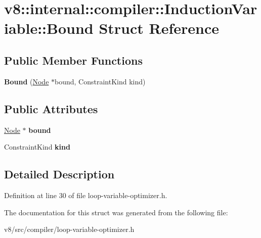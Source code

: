 \hypertarget{structv8_1_1internal_1_1compiler_1_1InductionVariable_1_1Bound}{}\section{v8\+:\+:internal\+:\+:compiler\+:\+:Induction\+Variable\+:\+:Bound Struct Reference}
\label{structv8_1_1internal_1_1compiler_1_1InductionVariable_1_1Bound}
\subsection*{Public Member Functions}
\begin{DoxyCompactItemize}
\item 
\mbox{\label{structv8_1_1internal_1_1compiler_1_1InductionVariable_1_1Bound_a3e6460bad855c54001a525810705dfc2}} 
{\bfseries Bound} (\mbox{\hyperlink{classv8_1_1internal_1_1compiler_1_1Node}{Node}} $\ast$bound, Constraint\+Kind kind)
\end{DoxyCompactItemize}
\subsection*{Public Attributes}
\begin{DoxyCompactItemize}
\item 
\mbox{\label{structv8_1_1internal_1_1compiler_1_1InductionVariable_1_1Bound_a56a3d55d4ac86681d7ff24e6509910f4}} 
\mbox{\hyperlink{classv8_1_1internal_1_1compiler_1_1Node}{Node}} $\ast$ {\bfseries bound}
\item 
\mbox{\label{structv8_1_1internal_1_1compiler_1_1InductionVariable_1_1Bound_a22c2caf3b8c55901507cb099ad4e8901}} 
Constraint\+Kind {\bfseries kind}
\end{DoxyCompactItemize}


\subsection{Detailed Description}


Definition at line 30 of file loop-\/variable-\/optimizer.\+h.



The documentation for this struct was generated from the following file\+:\begin{DoxyCompactItemize}
\item 
v8/src/compiler/loop-\/variable-\/optimizer.\+h\end{DoxyCompactItemize}
